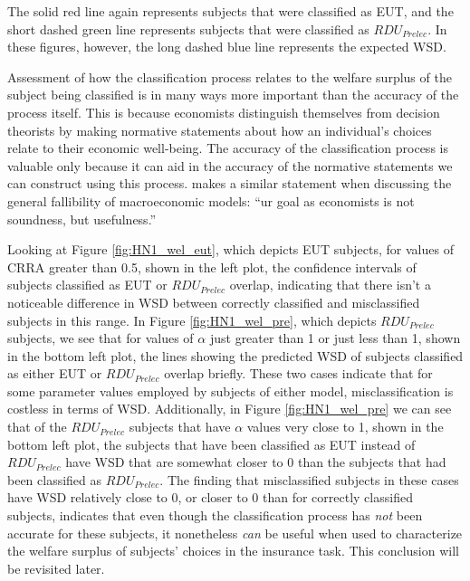 \documentclass[../main.tex]{subfiles}
\begin{document}
The solid red line again represents subjects that were classified as EUT, and the short dashed green line represents subjects that were classified as $\mathit{RDU_{Prelec}}$.
In these figures, however, the long dashed blue line represents the expected WSD.

Assessment of how the classification process relates to the welfare surplus of the subject being classified is in many ways more important than the accuracy of the process itself.
This is because economists distinguish themselves from decision theorists by making normative statements about how an individual's choices relate to their economic well-being.
The accuracy of the classification process is valuable only because it can aid in the accuracy of the normative statements we can construct using this process.
\textcite[25]{Leamer2012} makes a similar statement when discussing the general fallibility of macroeconomic models: \enquote{ur goal as economists is not soundness, but usefulness.}

Looking at Figure \ref{fig:HN1_wel_eut}, which depicts EUT subjects, for values of CRRA greater than 0.5, shown in the left plot, the confidence intervals of subjects classified as EUT or $\mathit{RDU_{Prelec}}$ overlap, indicating that there isn't a noticeable difference in WSD between correctly classified and misclassified subjects in this range.
In Figure \ref{fig:HN1_wel_pre}, which depicts $\mathit{RDU_{Prelec}}$ subjects, we see that for values of $\alpha$ just greater than 1 or just less than 1, shown in the bottom left plot, the lines showing the predicted WSD of subjects classified as either EUT or $\mathit{RDU_{Prelec}}$ overlap briefly.
These two cases indicate that for some parameter values employed by subjects of either model, misclassification is costless in terms of WSD.
Additionally, in Figure \ref{fig:HN1_wel_pre} we can see that of the $\mathit{RDU_{Prelec}}$ subjects that have $\alpha$ values very close to 1, shown in the bottom left plot, the subjects that have been classified as EUT instead of $\mathit{RDU_{Prelec}}$ have WSD that are somewhat closer to 0 than the subjects that had been classified as $\mathit{RDU_{Prelec}}$.
The finding that misclassified subjects in these cases have WSD relatively close to 0, or closer to 0 than for correctly classified subjects, indicates that even though the classification process has \textit{not} been accurate for these subjects, it nonetheless \textit{can} be useful when used to characterize the welfare surplus of subjects' choices in the insurance task.
This conclusion will be revisited later.
\end{document}

